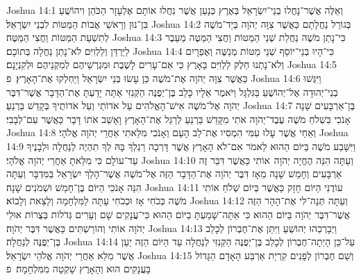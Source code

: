 Joshua 14:1	וְאֵלֶּה אֲשֶׁר־נָחֲלוּ בְנֵי־יִשְׂרָאֵל בְּאֶרֶץ כְּנָעַן אֲשֶׁר נִחֲלוּ אוֹתָם אֶלְעָזָר הַכֹּהֵן וִיהוֹשֻׁעַ בִּן־נוּן וְרָאשֵׁי אֲבוֹת הַמַּטּוֹת לִבְנֵי יִשְׂרָאֵל׃
Joshua 14:2	בְּגוֹרַל נַחֲלָתָם כַּאֲשֶׁר צִוָּה יְהֹוָה בְּיַד־מֹשֶׁה לְתִשְׁעַת הַמַּטּוֹת וַחֲצִי הַמַּטֶּה׃
Joshua 14:3	כִּי־נָתַן מֹשֶׁה נַחֲלַת שְׁנֵי הַמַּטּוֹת וַחֲצִי הַמַּטֶּה מֵעֵבֶר לַיַּרְדֵּן וְלַלְוִיִּם לֹא־נָתַן נַחֲלָה בְּתוֹכָם׃
Joshua 14:4	כִּי־הָיוּ בְנֵי־יוֹסֵף שְׁנֵי מַטּוֹת מְנַשֶּׁה וְאֶפְרָיִם וְלֹא־נָתְנוּ חֵלֶק לַלְוִיִּם בָּאָרֶץ כִּי אִם־עָרִים לָשֶׁבֶת וּמִגְרְשֵׁיהֶם לְמִקְנֵיהֶם וּלְקִנְיָנָם׃
Joshua 14:5	כַּאֲשֶׁר צִוָּה יְהֹוָה אֶת־מֹשֶׁה כֵּן עָשׂוּ בְּנֵי יִשְׂרָאֵל וַיַּחְלְקוּ אֶת־הָאָרֶץ׃ {פ}
Joshua 14:6	וַיִּגְּשׁוּ בְנֵי־יְהוּדָה אֶל־יְהוֹשֻׁעַ בַּגִּלְגָּל וַיֹּאמֶר אֵלָיו כָּלֵב בֶּן־יְפֻנֶּה הַקְּנִזִּי אַתָּה יָדַעְתָּ אֶת־הַדָּבָר אֲשֶׁר־דִּבֶּר יְהֹוָה אֶל־מֹשֶׁה אִישׁ־הָאֱלֹהִים עַל אֹדוֹתַי וְעַל אֹדוֹתֶיךָ בְּקָדֵשׁ בַּרְנֵעַ׃
Joshua 14:7	בֶּן־אַרְבָּעִים שָׁנָה אָנֹכִי בִּשְׁלֹחַ מֹשֶׁה עֶבֶד־יְהֹוָה אֹתִי מִקָּדֵשׁ בַּרְנֵעַ לְרַגֵּל אֶת־הָאָרֶץ וָאָשֵׁב אֹתוֹ דָּבָר כַּאֲשֶׁר עִם־לְבָבִי׃
Joshua 14:8	וְאַחַי אֲשֶׁר עָלוּ עִמִּי הִמְסִיו אֶת־לֵב הָעָם וְאָנֹכִי מִלֵּאתִי אַחֲרֵי יְהֹוָה אֱלֹהָי׃
Joshua 14:9	וַיִּשָּׁבַע מֹשֶׁה בַּיּוֹם הַהוּא לֵאמֹר אִם־לֹא הָאָרֶץ אֲשֶׁר דָּרְכָה רַגְלְךָ בָּהּ לְךָ תִהְיֶה לְנַחֲלָה וּלְבָנֶיךָ עַד־עוֹלָם כִּי מִלֵּאתָ אַחֲרֵי יְהֹוָה אֱלֹהָי׃
Joshua 14:10	וְעַתָּה הִנֵּה הֶחֱיָה יְהֹוָה  אוֹתִי כַּאֲשֶׁר דִּבֵּר זֶה אַרְבָּעִים וְחָמֵשׁ שָׁנָה מֵאָז דִּבֶּר יְהֹוָה אֶת־הַדָּבָר הַזֶּה אֶל־מֹשֶׁה אֲשֶׁר־הָלַךְ יִשְׂרָאֵל בַּמִּדְבָּר וְעַתָּה הִנֵּה אָנֹכִי הַיּוֹם בֶּן־חָמֵשׁ וּשְׁמֹנִים שָׁנָה׃
Joshua 14:11	עוֹדֶנִּי הַיּוֹם חָזָק כַּאֲשֶׁר בְּיוֹם שְׁלֹחַ אוֹתִי מֹשֶׁה כְּכֹחִי אָז וּכְכֹחִי עָתָּה לַמִּלְחָמָה וְלָצֵאת וְלָבוֹא׃
Joshua 14:12	וְעַתָּה תְּנָה־לִּי אֶת־הָהָר הַזֶּה אֲשֶׁר־דִּבֶּר יְהֹוָה בַּיּוֹם הַהוּא כִּי אַתָּה־שָׁמַעְתָּ בַיּוֹם הַהוּא כִּי־עֲנָקִים שָׁם וְעָרִים גְּדֹלוֹת בְּצֻרוֹת אוּלַי יְהֹוָה אוֹתִי וְהוֹרַשְׁתִּים כַּאֲשֶׁר דִּבֶּר יְהֹוָה׃
Joshua 14:13	וַיְבָרְכֵהוּ יְהוֹשֻׁעַ וַיִּתֵּן אֶת־חֶבְרוֹן לְכָלֵב בֶּן־יְפֻנֶּה לְנַחֲלָה׃
Joshua 14:14	עַל־כֵּן הָיְתָה־חֶבְרוֹן לְכָלֵב בֶּן־יְפֻנֶּה הַקְּנִזִּי לְנַחֲלָה עַד הַיּוֹם הַזֶּה יַעַן אֲשֶׁר מִלֵּא אַחֲרֵי יְהֹוָה אֱלֹהֵי יִשְׂרָאֵל׃
Joshua 14:15	וְשֵׁם חֶבְרוֹן לְפָנִים קִרְיַת אַרְבַּע הָאָדָם הַגָּדוֹל בָּעֲנָקִים הוּא וְהָאָרֶץ שָׁקְטָה מִמִּלְחָמָה׃ {פ}
